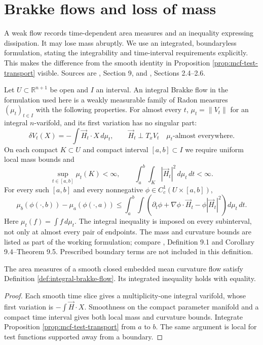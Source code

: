 \chapter{Brakke flows and loss of mass}\label{sec:brakke-flow}
A weak flow records time-dependent area measures and an inequality expressing dissipation. It may lose mass abruptly. We use an integrated, boundaryless formulation, stating the integrability and time-interval requirements explicitly. This makes the difference from the smooth identity in Proposition \ref{prop:mcf-test-transport} visible. Sources are \cite{WhiMCF15}, Section 9, and \cite{CCMS20}, Sections 2.4--2.6.

\begin{definition}\label{def:integral-brakke-flow}
Let $U\subset\mathbb R^{n+1}$ be open and $I$ an interval. An integral Brakke flow in the formulation used here is a weakly measurable family of Radon measures $(\mu_t)_{t\in I}$ with the following properties. For almost every $t$, $\mu_t=\|V_t\|$ for an integral $n$-varifold, and its first variation has no singular part:
\[
 \delta V_t(X)=-\int\vec H_t\cdot X\,d\mu_t,
 \qquad \vec H_t\perp T_xV_t\quad\mu_t\text{-almost everywhere}.
\]
On each compact $K\subset U$ and compact interval $[a,b]\subset I$ we require uniform local mass bounds and
\[
 \sup_{t\in[a,b]}\mu_t(K)<\infty,
 \qquad \int_a^b\int_K|\vec H_t|^2\,d\mu_t\,dt<\infty.
\]
For every such $[a,b]$ and every nonnegative $\phi\in C_c^1(U\times[a,b])$,
\[
 \mu_b(\phi(\cdot,b))-\mu_a(\phi(\cdot,a))
 \leq\int_a^b\int\left(\partial_t\phi+\nabla\phi\cdot\vec H_t
 -\phi|\vec H_t|^2\right)d\mu_t\,dt.
\]
Here $\mu_t(f)=\int f\,d\mu_t$. The integral inequality is imposed on every subinterval, not only at almost every pair of endpoints. The mass and curvature bounds are listed as part of the working formulation; compare \cite{WhiMCF15}, Definition 9.1 and Corollary 9.4--Theorem 9.5. Prescribed boundary terms are not included in this definition.
\end{definition}

\begin{proposition}\label{prop:smooth-to-brakke}
The area measures of a smooth closed embedded mean curvature flow satisfy Definition \ref{def:integral-brakke-flow}. Its integrated inequality holds with equality.
\end{proposition}
\begin{proof}
Each smooth time slice gives a multiplicity-one integral varifold, whose first variation is $-\int\vec H\cdot X$. Smoothness on the compact parameter manifold and a compact time interval gives both local mass and curvature bounds. Integrate Proposition \ref{prop:mcf-test-transport} from $a$ to $b$. The same argument is local for test functions supported away from a boundary.
\end{proof}

